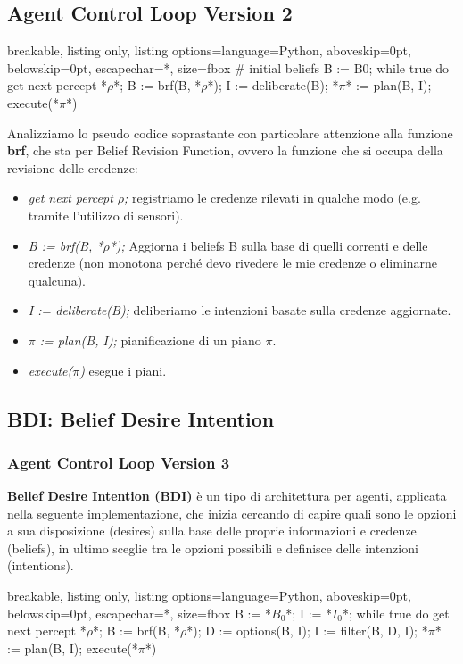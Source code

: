 \subsection{Agent Control Loop Version 2}
\begin{tcblisting}{breakable, listing only, listing options={language=Python, aboveskip=0pt, belowskip=0pt, escapechar=*}, size=fbox}
# initial beliefs B := B0;
while true do
    get next percept *$\rho$*;
    B := brf(B, *$\rho$*);
    I := deliberate(B);
    *$\pi$* := plan(B, I);
    execute(*$\pi$*)
\end{tcblisting}

Analizziamo lo pseudo codice soprastante con particolare attenzione alla funzione \textbf{brf}, che sta per Belief Revision Function, ovvero la funzione che si occupa della revisione delle credenze:
\begin{itemize}
    \item \textit{get next percept $\rho$;} registriamo le credenze rilevati in qualche modo (e.g. tramite l'utilizzo di sensori).
    \item \textit{B := brf(B, *$\rho$*);} Aggiorna i beliefs B sulla base di quelli correnti e delle credenze (non monotona perché devo rivedere le mie credenze o eliminarne qualcuna).
    \item \textit{I := deliberate(B);} deliberiamo le intenzioni basate sulla credenze aggiornate.
    \item \textit{$\pi$ := plan(B, I);} pianificazione di un piano $\pi$.
    \item \textit{execute($\pi$)} esegue i piani.
\end{itemize}

\subsection{BDI: Belief Desire Intention}
\subsubsection{Agent Control Loop Version 3}
\textbf{Belief Desire Intention (BDI)} è un tipo di architettura per agenti, applicata nella seguente implementazione, che inizia cercando di capire quali sono le opzioni a sua disposizione (desires) sulla base delle proprie informazioni e credenze (beliefs), in ultimo sceglie tra le opzioni possibili e definisce delle intenzioni (intentions).

\begin{tcblisting}{breakable, listing only, listing options={language=Python, aboveskip=0pt, belowskip=0pt, escapechar=*}, size=fbox}
B := *$B_0$*;
I := *$I_0$*;
while true do
    get next percept *$\rho$*;
    B := brf(B, *$\rho$*);
    D := options(B, I);
    I := filter(B, D, I);
    *$\pi$* := plan(B, I);
    execute(*$\pi$*)
\end{tcblisting}

